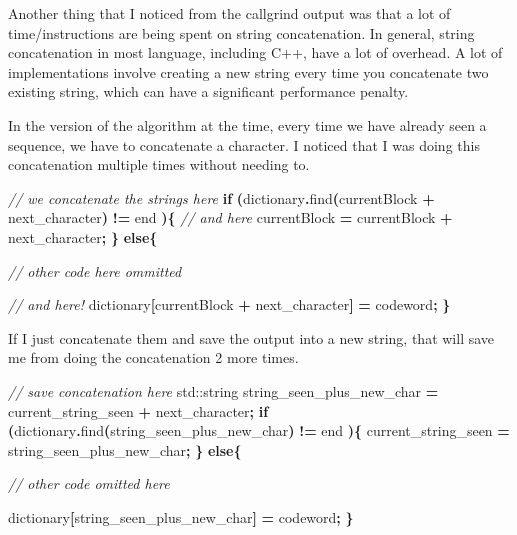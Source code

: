 \documentclass[12pt,twoside]{reedthesis}
\newenvironment{Shaded}{\begin{snugshade}}{\end{snugshade}}
\newcommand{\BuiltInTok}[1]{#1}
\newcommand{\CommentTok}[1]{\textcolor[rgb]{0.56,0.35,0.01}{\textit{#1}}}
\newcommand{\ControlFlowTok}[1]{\textcolor[rgb]{0.13,0.29,0.53}{\textbf{#1}}}
\newcommand{\NormalTok}[1]{#1}
\newcommand{\OperatorTok}[1]{\textcolor[rgb]{0.81,0.36,0.00}{\textbf{#1}}}
\begin{document}
Another thing that I noticed from the callgrind output was that a lot of time/instructions are being spent on string concatenation. In general, string concatenation in most language, including C++, have a lot of overhead. A lot of implementations involve creating a new string every time you concatenate two existing string, which can have a significant performance penalty.

In the version of the algorithm at the time, every time we have already seen a sequence, we have to concatenate a character. I noticed that I was doing this concatenation multiple times without needing to.
\begin{Shaded}
\begin{Highlighting}[]
        \CommentTok{// we concatenate the strings here}
        \ControlFlowTok{if} \OperatorTok{(}\NormalTok{dictionary}\OperatorTok{.}\NormalTok{find}\OperatorTok{(}\NormalTok{currentBlock }\OperatorTok{+}\NormalTok{ next\_character}\OperatorTok{)} \OperatorTok{!=}\NormalTok{ end }\OperatorTok{)\{}
            \CommentTok{// and here}
\NormalTok{            currentBlock }\OperatorTok{=}\NormalTok{ currentBlock }\OperatorTok{+}\NormalTok{ next\_character}\OperatorTok{;}
        \OperatorTok{\}}
        \ControlFlowTok{else}\OperatorTok{\{}

            \CommentTok{// other code here ommitted}


            \CommentTok{// and here! }
\NormalTok{            dictionary}\OperatorTok{[}\NormalTok{currentBlock }\OperatorTok{+}\NormalTok{ next\_character}\OperatorTok{]} \OperatorTok{=}\NormalTok{ codeword}\OperatorTok{;}
        \OperatorTok{\}}
\end{Highlighting}
\end{Shaded}
If I just concatenate them and save the output into a new string, that will save me from doing the concatenation 2 more times.
\begin{Shaded}
\begin{Highlighting}[]
    \CommentTok{// save concatenation here}
      \BuiltInTok{std::}\NormalTok{string}\OperatorTok{ }\NormalTok{string\_seen\_plus\_new\_char }\OperatorTok{=}\NormalTok{ current\_string\_seen }\OperatorTok{+}\NormalTok{ next\_character}\OperatorTok{;}
        \ControlFlowTok{if} \OperatorTok{(}\NormalTok{dictionary}\OperatorTok{.}\NormalTok{find}\OperatorTok{(}\NormalTok{string\_seen\_plus\_new\_char}\OperatorTok{)} \OperatorTok{!=}\NormalTok{ end }\OperatorTok{)\{}
\NormalTok{            current\_string\_seen }\OperatorTok{=}\NormalTok{ string\_seen\_plus\_new\_char}\OperatorTok{;}
        \OperatorTok{\}}
        \ControlFlowTok{else}\OperatorTok{\{}

    \CommentTok{// other code omitted here}

\NormalTok{            dictionary}\OperatorTok{[}\NormalTok{string\_seen\_plus\_new\_char}\OperatorTok{]} \OperatorTok{=}\NormalTok{ codeword}\OperatorTok{;}
        \OperatorTok{\}}
\end{Highlighting}
\end{Shaded}
\end{document}
